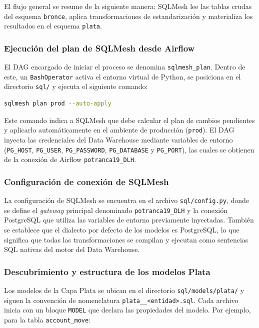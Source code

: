 El flujo general se resume de la siguiente manera: SQLMesh lee las tablas crudas del esquema \texttt{bronce}, aplica transformaciones de estandarización y materializa los resultados en el esquema \texttt{plata}.

\subsubsection{Ejecución del plan de SQLMesh desde Airflow}

El DAG encargado de iniciar el proceso se denomina \texttt{sqlmesh\_plan}. Dentro de este, un \texttt{Bash\-Op\-er\-a\-tor} activa el entorno virtual de Python, se posiciona en el directorio \texttt{sql/} y ejecuta el siguiente comando:

\begin{lstlisting}[language=bash, breaklines=true]
sqlmesh plan prod --auto-apply
\end{lstlisting}

Este comando indica a SQLMesh que debe calcular el plan de cambios pendientes y aplicarlo automáticamente en el ambiente de producción (\texttt{prod}). El DAG inyecta las credenciales del Data Warehouse mediante variables de entorno (\texttt{PG\_HOST}, \texttt{PG\_USER}, \texttt{PG\_PASSWORD}, \texttt{PG\_DATABASE} y \texttt{PG\_PORT}), las cuales se obtienen de la conexión de Airflow \texttt{potranca19\_DLH}.

\subsubsection{Configuración de conexión de SQLMesh}

La configuración de SQLMesh se encuentra en el archivo \texttt{sql/config.py}, donde se define el \textit{gateway} principal denominado \texttt{potranca19\_DLH} y la conexión PostgreSQL que utiliza las variables de entorno previamente inyectadas. También se establece que el dialecto por defecto de los modelos es PostgreSQL, lo que significa que todas las transformaciones se compilan y ejecutan como sentencias SQL nativas del motor del Data Warehouse.

\subsubsection{Descubrimiento y estructura de los modelos Plata}

Los modelos de la Capa Plata se ubican en el directorio \texttt{sql/models/plata/} y siguen la convención de nomenclatura \texttt{plata\_\_<entidad>.sql}. Cada archivo inicia con un bloque \texttt{MODEL} que declara las propiedades del modelo. Por ejemplo, para la tabla \texttt{account\_move}:

